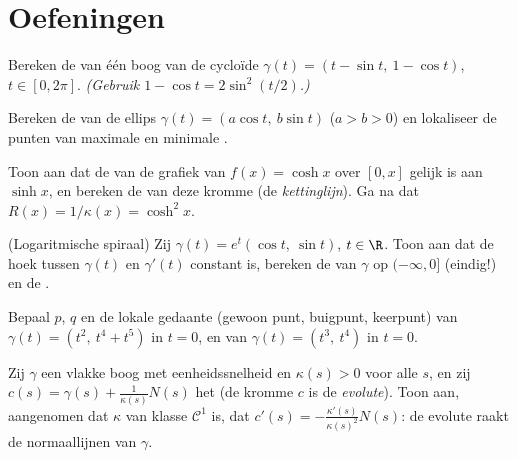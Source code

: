 \section{Oefeningen}

\begin{exercise}[$\star$]\label{exo:b2:curves:1}
Bereken de  van één boog van de cycloïde $\gamma(t) = (t -
\sin t,\ 1 - \cos t)$, $t \in [0, 2\pi]$. \emph{(Gebruik $1 - \cos
t = 2\sin^2(t/2)$.)}
\end{exercise}

\begin{exercise}[$\star$]\label{exo:b2:curves:2}
Bereken de  van de ellips $\gamma(t) = (a\cos t,\ b\sin t)$
($a > b > 0$) en lokaliseer de punten van maximale en minimale
.
\end{exercise}

\begin{exercise}[$\star$]\label{exo:b2:curves:3}
Toon aan dat de  van de grafiek van $f(x) = \cosh x$ over
$[0, x]$ gelijk is aan $\sinh x$, en bereken de  van deze
kromme (de \emph{kettinglijn}). Ga na dat $R(x) = 1/\kappa(x) =
\cosh^2 x$.
\end{exercise}

\begin{exercise}[$\star\star$]\label{exo:b2:curves:4}
(Logaritmische spiraal) Zij $\gamma(t) = e^{t}(\cos t,\ \sin t)$,
$t \in \R$. Toon aan dat de hoek tussen $\gamma(t)$ en $\gamma'(t)$
constant is, bereken de  van $\gamma$ op $(-\infty, 0]$
(eindig!) en de .
\end{exercise}

\begin{exercise}[$\star\star$]\label{exo:b2:curves:5}
Bepaal $p$, $q$ en de lokale gedaante (gewoon punt, buigpunt,
keerpunt) van $\gamma(t) = (t^2,\ t^4 + t^5)$ in $t = 0$, en van
$\gamma(t) = (t^3,\ t^4)$ in $t = 0$.
\end{exercise}

\begin{exercise}[$\star\star$]\label{exo:b2:curves:6}
Zij $\gamma$ een vlakke boog met eenheidssnelheid en $\kappa(s) >
0$ voor alle $s$, en zij $c(s) = \gamma(s) + \frac{1}{\kappa(s)}N(s)$
het  (de kromme $c$ is de \emph{evolute}). Toon
aan, aangenomen dat $\kappa$ van klasse $\mathcal{C}^1$ is, dat
$c'(s) = -\frac{\kappa'(s)}{\kappa(s)^2}N(s)$: de evolute raakt de
normaallijnen van $\gamma$.
\end{exercise}

